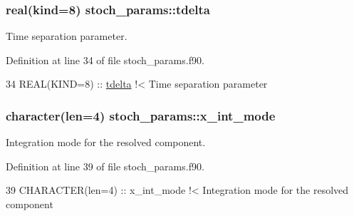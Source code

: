 \subsubsection[{\texorpdfstring{tdelta}{tdelta}}]{\setlength{\rightskip}{0pt plus 5cm}real(kind=8) stoch\+\_\+params\+::tdelta}\hypertarget{namespacestoch__params_a3995bce17d12b533df6b86ab0072b7c3}{}\label{namespacestoch__params_a3995bce17d12b533df6b86ab0072b7c3}


Time separation parameter. 



Definition at line 34 of file stoch\+\_\+params.\+f90.


\begin{DoxyCode}
34   \textcolor{keywordtype}{REAL(KIND=8)} :: \hyperlink{namespacestoch__params_a3995bce17d12b533df6b86ab0072b7c3}{tdelta}\textcolor{comment}{             !< Time separation parameter}
\end{DoxyCode}
\subsubsection[{\texorpdfstring{x\+\_\+int\+\_\+mode}{x_int_mode}}]{\setlength{\rightskip}{0pt plus 5cm}character(len=4) stoch\+\_\+params\+::x\+\_\+int\+\_\+mode}\hypertarget{namespacestoch__params_ac3dca68023a442b69df79caaaea78894}{}\label{namespacestoch__params_ac3dca68023a442b69df79caaaea78894}


Integration mode for the resolved component. 



Definition at line 39 of file stoch\+\_\+params.\+f90.


\begin{DoxyCode}
39   \textcolor{keywordtype}{CHARACTER(len=4)} :: x\_int\_mode\textcolor{comment}{     !< Integration mode for the resolved component}
\end{DoxyCode}

